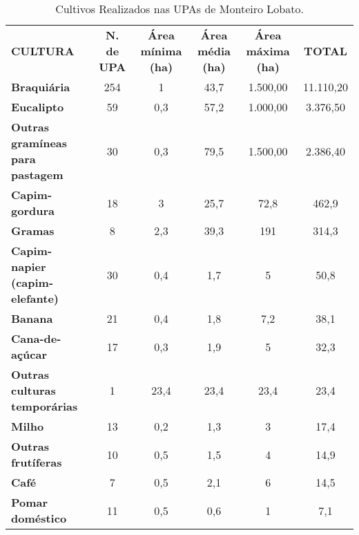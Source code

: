 \begin{table}[htbp]
  \centering
  \caption{Cultivos Realizados nas UPAs de Monteiro Lobato.}
    \begin{tabular}{p{14.5em}|c|c|c|c|c}
    \rowcolor[rgb]{ .969,  .588,  .275} \textcolor[rgb]{ 1,  1,  1}{\textbf{CULTURA}} & \multicolumn{1}{p{4.215em}|}{\textcolor[rgb]{ 1,  1,  1}{\textbf{N. de UPA}}} & \multicolumn{1}{p{4.215em}|}{\textcolor[rgb]{ 1,  1,  1}{\textbf{Área mínima (ha)}}} & \multicolumn{1}{p{4.215em}|}{\textcolor[rgb]{ 1,  1,  1}{\textbf{Área média (ha)}}} & \multicolumn{1}{p{5.07em}|}{\textcolor[rgb]{ 1,  1,  1}{\textbf{Área máxima (ha)}}} & \multicolumn{1}{p{5.43em}}{\textcolor[rgb]{ 1,  1,  1}{\textbf{TOTAL}}} \\
    \rowcolor[rgb]{ .984,  .831,  .706} \textbf{Braquiária} & 254   & 1     & 43,7  & 1.500,00 & 11.110,20 \\
    \rowcolor[rgb]{ .992,  .914,  .851} \textbf{Eucalipto} & 59    & 0,3   & 57,2  & 1.000,00 & 3.376,50 \\
    \rowcolor[rgb]{ .984,  .831,  .706} \textbf{Outras gramíneas para pastagem} & 30    & 0,3   & 79,5  & 1.500,00 & 2.386,40 \\
    \rowcolor[rgb]{ .992,  .914,  .851} \textbf{Capim-gordura} & 18    & 3     & 25,7  & 72,8  & 462,9 \\
    \rowcolor[rgb]{ .984,  .831,  .706} \textbf{Gramas} & 8     & 2,3   & 39,3  & 191   & 314,3 \\
    \rowcolor[rgb]{ .992,  .914,  .851} \textbf{Capim-napier (capim-elefante)} & 30    & 0,4   & 1,7   & 5     & 50,8 \\
    \rowcolor[rgb]{ .984,  .831,  .706} \textbf{Banana} & 21    & 0,4   & 1,8   & 7,2   & 38,1 \\
    \rowcolor[rgb]{ .992,  .914,  .851} \textbf{Cana-de-açúcar} & 17    & 0,3   & 1,9   & 5     & 32,3 \\
    \rowcolor[rgb]{ .984,  .831,  .706} \textbf{Outras culturas temporárias} & 1     & 23,4  & 23,4  & 23,4  & 23,4 \\
    \rowcolor[rgb]{ .992,  .914,  .851} \textbf{Milho} & 13    & 0,2   & 1,3   & 3     & 17,4 \\
    \rowcolor[rgb]{ .984,  .831,  .706} \textbf{Outras frutíferas} & 10    & 0,5   & 1,5   & 4     & 14,9 \\
    \rowcolor[rgb]{ .992,  .914,  .851} \textbf{Café} & 7     & 0,5   & 2,1   & 6     & 14,5 \\
    \rowcolor[rgb]{ .984,  .831,  .706} \textbf{Pomar doméstico} & 11    & 0,5   & 0,6   & 1     & 7,1 \\

\end{tabular}
\end{table}

